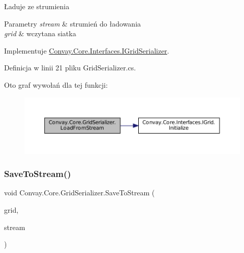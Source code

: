Ładuje ze strumienia 


\begin{DoxyParams}{Parametry}
{\em stream} & strumień do ładowania\\
\hline
{\em grid} & wczytana siatka\\
\hline
\end{DoxyParams}


Implementuje \hyperlink{interface_convay_1_1_core_1_1_interfaces_1_1_i_grid_serializer_ab6297bf5bb8f31e4ee4c27e4edfcd2bc}{Convay.\+Core.\+Interfaces.\+I\+Grid\+Serializer}.



Definicja w linii 21 pliku Grid\+Serializer.\+cs.

Oto graf wywołań dla tej funkcji\+:
\nopagebreak
\begin{figure}[H]
\begin{center}
\leavevmode
\includegraphics[width=350pt]{class_convay_1_1_core_1_1_grid_serializer_a2df3c14a45db4c5d498cb26ccb3a1529_cgraph}
\end{center}
\end{figure}
\hypertarget{class_convay_1_1_core_1_1_grid_serializer_a3c29cdb004954acf74fb049393786f65}{}\label{class_convay_1_1_core_1_1_grid_serializer_a3c29cdb004954acf74fb049393786f65} 
\subsubsection{\texorpdfstring{Save\+To\+Stream()}{SaveToStream()}}
{\footnotesize\ttfamily void Convay.\+Core.\+Grid\+Serializer.\+Save\+To\+Stream (\begin{DoxyParamCaption}\item[{\hyperlink{interface_convay_1_1_core_1_1_interfaces_1_1_i_grid}{I\+Grid}}]{grid,  }\item[{Stream}]{stream }\end{DoxyParamCaption})}



